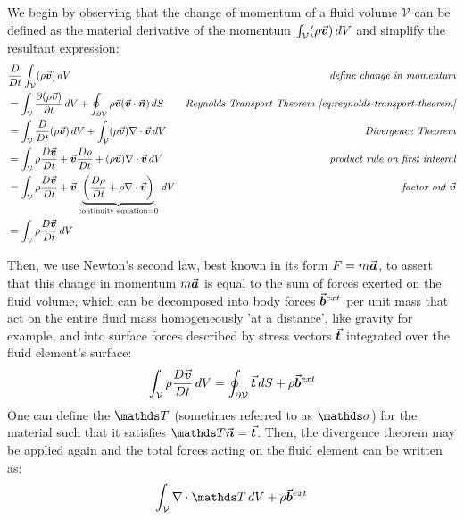 We begin by observing that the change of momentum of a fluid volume $\mathcal{V}$ can be defined as the material derivative of the momentum $\int_\mathcal{V}(\rho\vec{\bm{v}})\,dV$ and simplify the resultant expression\autocite*{continuum-intro}:
\begin{align}
     & \frac{D}{Dt}\int_\mathcal{V}(\rho\vec{\bm{v}})\,dV                                                                                                                    & \textit{define change in momentum}      \\ & = \int_\mathcal{V} \frac{\partial (\rho\vec{\bm{v}})}{\partial t}\,dV + \oint_{\partial \mathcal{V}} \rho \vec{\bm{v}} (\vec{\bm{v}} \cdot \vec{\bm{n}})\,dS & \textit{Reynolds Transport Theorem \ref{eq:reynolds-transport-theorem}} \\
     & = \int_\mathcal{V}\frac{D}{Dt}(\rho\vec{\bm{v}})\,dV + \int_\mathcal{V} (\rho\vec{\bm{v}} )\nabla\cdot\vec{\bm{v}} \,dV                                                         & \textit{Divergence Theorem}             \\
     & = \int_\mathcal{V} \rho\frac{D\vec{\bm{v}}}{Dt} + \vec{\bm{v}}\frac{D\rho}{Dt} + (\rho\vec{\bm{v}}) \nabla\cdot\vec{\bm{v}} \,dV                                                     & \textit{product rule on first integral} \\
     & = \int_\mathcal{V} \rho\frac{D\vec{\bm{v}}}{Dt} + \vec{\bm{v}} \underbrace{\left( \frac{D\rho}{Dt} + \rho \nabla\cdot\vec{\bm{v}} \right)}_{\text{continuity equation} =0} \,dV & \textit{factor out $\vec{\bm{v}}$}           \\\label{eq:momentum-lhs}
     & = \int_\mathcal{V} \rho\frac{D\vec{\bm{v}}}{Dt} \,dV
\end{align}

Then, we use Newton's second law, best known in its form $F=m\vec{\bm{a}}$, to assert that this change in momentum $m\vec{\bm{a}}$ is equal to the sum of forces exerted on the fluid volume, which can be decomposed into body forces $\vec{\bm{b}}^{ext}$ per unit mass\autocite*{continuum-intro} that act on the entire fluid mass homogeneously 'at a distance'\autocite*{anderson}, like gravity for example, and into surface forces described by stress vectors $\vec{\bm{t}}$ integrated over the fluid element's surface\autocite*{continuum-intro}:
\begin{equation}
    \int_\mathcal{V} \rho\frac{D\vec{\bm{v}}}{Dt} \,dV = \oint_\mathcal{\partial V}\vec{\bm{t}}\,dS + \rho\vec{\bm{b}}^{ext}
\end{equation}
One can define the  $\mat{T}$ (sometimes referred to as $\mat{\sigma}$) for the material such that it satisfies\autocite*{continuum-intro} $\mat{T}\vek{n} = \vek{t}$. Then, the divergence theorem may be applied again and the total forces acting on the fluid element can be written as:
\begin{equation}\label{eq:momentum-total-forces}
    \int_\mathcal{V}\nabla\cdot\mat{T}\,dV + \rho\vek{b}^{ext}
\end{equation}

